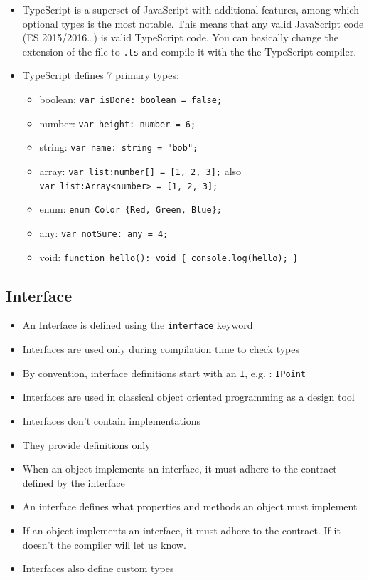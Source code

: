 \documentclass[12pt,]{article}
\providecommand{\tightlist}{%
  \setlength{\itemsep}{0pt}\setlength{\parskip}{0pt}}
\begin{document}
\begin{itemize}
\item
  TypeScript is a superset of JavaScript with additional features, among
  which optional types is the most notable. This means that any valid
  JavaScript code (ES 2015/2016\ldots{}) is valid TypeScript code. You
  can basically change the extension of the file to \texttt{.ts} and
  compile it with the the TypeScript compiler.
\item
  TypeScript defines 7 primary types:

  \begin{itemize}
  \tightlist
  \item
    boolean: \texttt{var\ isDone:\ boolean\ =\ false;}
  \item
    number: \texttt{var\ height:\ number\ =\ 6;}
  \item
    string: \texttt{var\ name:\ string\ =\ "bob";}
  \item
    array: \texttt{var\ list:number{[}{]}\ =\ {[}1,\ 2,\ 3{]};} also
    \texttt{var\ list:Array\textless{}number\textgreater{}\ =\ {[}1,\ 2,\ 3{]};}
  \item
    enum: \texttt{enum\ Color\ \{Red,\ Green,\ Blue\};}
  \item
    any: \texttt{var\ notSure:\ any\ =\ 4;}
  \item
    void:
    \texttt{function\ hello():\ void\ \{\ console.log(\textquotesingle{}hello\textquotesingle{});\ \}}
  \end{itemize}
\end{itemize}

\subsection{Interface}\label{interface}

\begin{itemize}
\tightlist
\item
  An Interface is defined using the \texttt{interface} keyword
\item
  Interfaces are used only during compilation time to check types
\item
  By convention, interface definitions start with an \texttt{I}, e.g. :
  \texttt{IPoint}
\item
  Interfaces are used in classical object oriented programming as a
  design tool
\item
  Interfaces don't contain implementations
\item
  They provide definitions only
\item
  When an object implements an interface, it must adhere to the contract
  defined by the interface
\item
  An interface defines what properties and methods an object must
  implement
\item
  If an object implements an interface, it must adhere to the contract.
  If it doesn't the compiler will let us know.
\item
  Interfaces also define custom types
\end{itemize}
\end{document}
